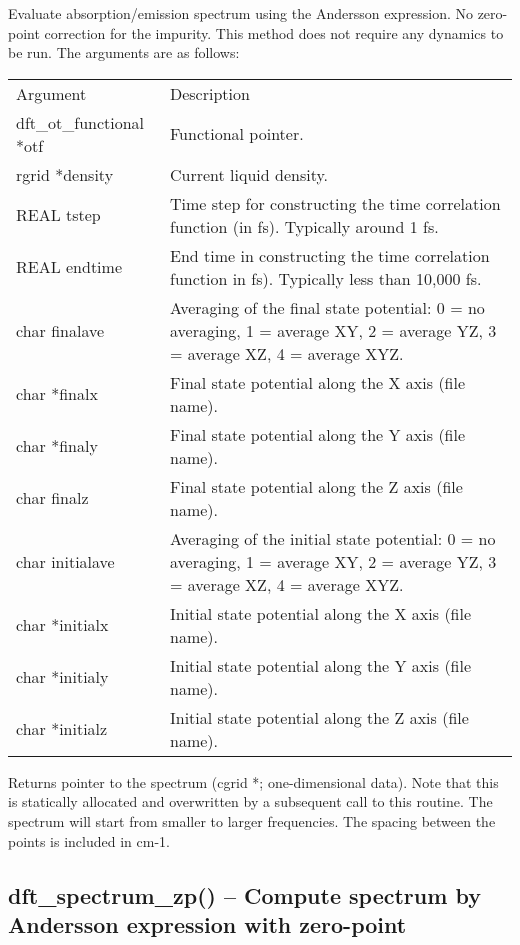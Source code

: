 \documentclass[12pt,letterpaper]{report}
\begin{document}
Evaluate absorption/emission spectrum using the Andersson expression. No zero-point correction for the impurity. This method does not require any dynamics to be run. The arguments are as follows:
\begin{longtable}{p{} p{}}
Argument & Description\\
\cline{1-2}
dft\_ot\_functional *otf & Functional pointer.\\
rgrid *density & Current liquid density.\\
REAL tstep & Time step for constructing the time correlation function (in fs). Typically around 1 fs.\\
REAL endtime & End time in constructing the time correlation function in fs). Typically less than 10,000 fs.\\
char finalave & Averaging of the final state potential: 0 = no averaging, 1 = average XY, 2 = average YZ, 3 = average XZ, 4 = average XYZ.\\
char *finalx & Final state potential along the X axis (file name).\\
char *finaly & Final state potential along the Y axis (file name).\\
char finalz & Final state potential along the Z axis (file name).\\
char initialave & Averaging of the initial state potential: 0 = no averaging, 1 = average XY, 2 = average YZ, 3 = average XZ, 4 = average XYZ.\\
char *initialx & Initial state potential along the X axis (file name).\\
char *initialy & Initial state potential along the Y axis (file name).\\
char *initialz & Initial state potential along the Z axis (file name).\\
\end{longtable}
\noindent
Returns pointer to the spectrum (cgrid *; one-dimensional data). Note that this is statically allocated and overwritten by a subsequent call to this routine. The spectrum will start from smaller to larger frequencies. The spacing between the points is included in cm-1.

\subsection{dft\_spectrum\_zp() -- Compute spectrum by Andersson expression with zero-point}
\end{document}
